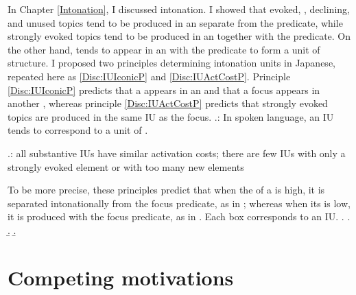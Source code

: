 In Chapter \ref{Intonation},
I discussed intonation.
I showed that
evoked, , declining, and unused topics tend to be produced in an  separate from the predicate,
while strongly evoked topics tend to be produced in an  together with the predicate.
On the other hand,  tends to appear in an  with the predicate
to form a unit of  structure.
I proposed two principles determining intonation units in Japanese,
repeated here as \ref{Disc:IUIconicP} and \ref{Disc:IUActCostP}.
Principle \ref{Disc:IUIconicP} predicts that
a  appears in an  and that a focus appears in another ,
whereas principle \ref{Disc:IUActCostP} predicts that strongly evoked topics are produced in the same IU as the focus.
%
\ex.\label{Disc:IUIconicP}:
	In spoken language,
	an IU tends to correspond to a unit of .

\ex.\label{Disc:IUActCostP}:
     all substantive IUs have similar activation costs;
     there are few IUs with only a strongly evoked element or with too many new elements

To be more precise, these principles predict that
when the  of a  is high,
it is separated intonationally from the focus predicate, as in \Next[a];
whereas when its  is low,
it is produced with the focus predicate, as in \Next[b-c].
Each box corresponds to an IU.
%
\ex.
 \a.  
 \b. 
 \b. 

\section{Competing motivations}\label{Disc:CompMotivations}

